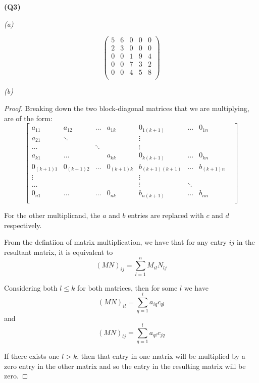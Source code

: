 \documentclass[12pt, a4paper]{article}
\begin{document}
\textbf{(Q3)}

\textit{(a)}

\[
    \begin{pmatrix}
        5 & 6 & 0 & 0 & 0\\
        2 & 3 & 0 & 0 & 0\\
        0 & 0 & 1 & 9 & 4\\
        0 & 0 & 7 & 3 & 2\\
        0 & 0 & 4 & 5 & 8\\
    \end{pmatrix}
\]

\textit{(b)}
\begin{proof}
    Breaking down the two block-diagonal matrices that we are multiplying,
    are of the form:
    \[
        \begin{bmatrix}
            a_{11} & a_{12} & \ldots & a_{1k} & 0_{1(k+1)} & \ldots & 0_{1n}\\
            a_{21} & \ddots &        &        & \vdots     &        &\\
            \ldots &        & \ddots &        & \vdots     &        &\\
            a_{k1} & \ldots &        & a_{kk} & 0_{k(k+1)} & \ldots & 0_{kn}\\
            0_{(k+1)1} & 0_{(k+1)2} & \ldots & 0_{(k+1)k}
            & b_{(k+1)(k+1)} & \ldots & b_{(k+1)n}\\
            \vdots & &        &        & \vdots &            &        &\\
            \ldots &        &        & & \vdots & \ddots &\\
            0_{n1} & \ldots & \ldots & 0_{nk} & b_{n(k+1)} & \ldots & b_{nn}\\
        \end{bmatrix}
    \]

    For the other multiplicand, the $a$ and $b$ entries are replaced
    with $c$ and $d$ respectively.

    From the defintiion of matrix multiplication, we have that for
    any entry $ij$ in the resultant matrix, it is equivalent to
    \[
        (MN)_{ij} = \sum_{l = 1}^{n} M_{il}N_{lj}
    \]

    Considering both $l \leq k$ for both matrices, then for some $l$ we have 
    \[(MN)_{il} = \sum_{q = 1}^{l} a_{iq}c_{ql}\] and
    \[(MN)_{lj} = \sum_{q = 1}^{l} a_{qi}c_{jq}\]

    If there exists one $l > k$, then that entry in one matrix will be
    multiplied by a zero entry in the other matrix
    and so the entry in the resulting matrix will be zero.


\end{proof}
\end{document}
